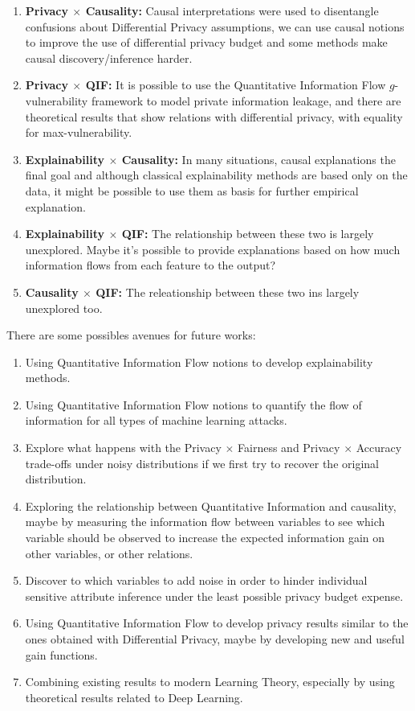 \documentclass[conference]{IEEEtran}
\begin{document}
\begin{enumerate}
    \item \textbf{Privacy $\times$ Causality:} Causal interpretations were used to disentangle confusions about Differential Privacy assumptions, we can use causal notions to improve the use of differential privacy budget and some methods make causal discovery/inference harder.
    \item \textbf{Privacy $\times$ QIF:} It is possible to use the Quantitative Information Flow $g$-vulnerability framework to model private information leakage, and there are theoretical results that show relations with differential privacy, with equality for max-vulnerability.
    \item \textbf{Explainability $\times$ Causality:} In many situations, causal explanations the final goal and although classical explainability methods are based only on the data, it might be possible to use them as basis for further empirical explanation.
    \item \textbf{Explainability $\times$ QIF:} The relationship between these two is largely unexplored. Maybe it's possible to provide explanations based on how much information flows from each feature to the output?
    \item \textbf{Causality $\times$ QIF:} The releationship between these two ins largely unexplored too.
\end{enumerate}

There are some possibles avenues for future works:

\begin{enumerate}
    \item Using Quantitative Information Flow notions to develop explainability methods.
    \item Using Quantitative Information Flow notions to quantify the flow of information for all types of machine learning attacks.
    \item Explore what happens with the Privacy $\times$ Fairness and Privacy $\times$ Accuracy trade-offs under noisy distributions if we first try to recover the original distribution.
    \item Exploring the relationship between Quantitative Information and causality, maybe by measuring the information flow between variables to see which variable should be observed to increase the expected information gain on other variables, or other relations.
    \item Discover to which variables to add noise in order to hinder individual sensitive attribute inference under the least possible privacy budget expense.
    \item Using Quantitative Information Flow to develop privacy results similar to the ones obtained with Differential Privacy, maybe by developing new and useful gain functions.
    \item Combining existing results to modern Learning Theory, especially by using theoretical results related to Deep Learning.
\end{enumerate}
\end{document}
